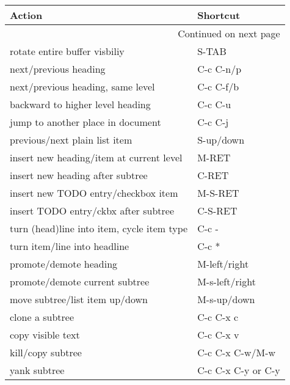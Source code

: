 \documentclass[english]{rcalibrionecolumn}
\begin{document}
\begin{longtable}{ll}

 \textbf{Action}                               &  \textbf{Shortcut}    \\
\hline
\endhead
\hline\multicolumn{2}{r}{Continued on next page}\
\endfoot
\endlastfoot
 \textbf{Headings}                             &                        \\
 rotate entire buffer visbiliy                 &  S-TAB                 \\
 next/previous heading                         &  C-c C-n/p             \\
 next/previous heading, same level             &  C-c C-f/b             \\
 backward to higher level heading              &  C-c C-u               \\
 jump to another place in document             &  C-c C-j               \\
 previous/next plain list item                 &  S-up/down             \\
 insert new heading/item at current level      &  M-RET                 \\
 insert new heading after subtree              &  C-RET                 \\
 insert new TODO entry/checkbox item           &  M-S-RET               \\
 insert TODO entry/ckbx after subtree          &  C-S-RET               \\
 turn (head)line into item, cycle item type    &  C-c -                 \\
 turn item/line into headline                  &  C-c *                 \\
 promote/demote heading                        &  M-left/right          \\
 promote/demote current subtree                &  M-s-left/right        \\
 move subtree/list item up/down                &  M-s-up/down           \\
 clone a subtree                               &  C-c C-x c             \\
 copy visible text                             &  C-c C-x v             \\
 kill/copy subtree                             &  C-c C-x C-w/M-w       \\
 yank subtree                                  &  C-c C-x C-y or C-y    \\

\end{longtable}
\end{document}
